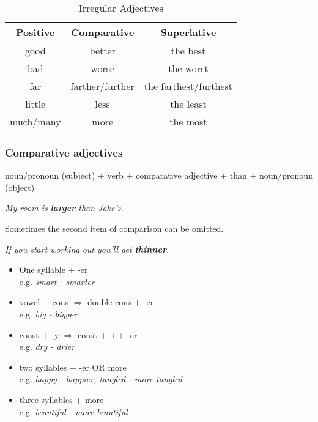 \documentclass[hidelinks,10pt,a4paper]{article}
\begin{document}
\begin{table}[h]
\begin{center}
\begin{tabular}{|c|c|c|}
	\hline
	\textbf{Positive} & \textbf{Comparative}  & \textbf{Superlative} \\ \hline
	good & better & the best \\ \hline
	bad & worse & the worst \\ \hline
	far & farther/further & the farthest/furthest \\ \hline
	little & less & the least \\ \hline
	much/many & more & the most \\ \hline
\end{tabular}
\end{center}
\caption{Irregular Adjectives} \label{tab:pcs2}
\end{table}

\subsubsection{Comparative adjectives}
noun/pronoun (subject) + verb + comparative adjective + than + noun/pronoun (object)

\begin{center}
	\textit{My room is \textbf{larger} than Jake's.}
\end{center}

Sometimes the second item of comparison can be omitted.
\begin{center}
	\textit{If you start working out you'll get \textbf{thinner}.}
\end{center}

\begin{itemize}
	\item One syllable + -er \\
		e.g. \textit{smart - smarter}
	\item vowel + cons $\Rightarrow$ double cons + -er \\
		e.g. \textit{big - bigger}
	\item const + -y $\Rightarrow$ const + -i + -er \\
		e.g. \textit{dry - drier}
	\item two syllables + -er OR more \\
		e.g. \textit{happy - happier, tangled - more tangled}
	\item three syllables + more \\
		e.g. \textit{beautiful - more beautiful}
\end{itemize}
\end{document}
